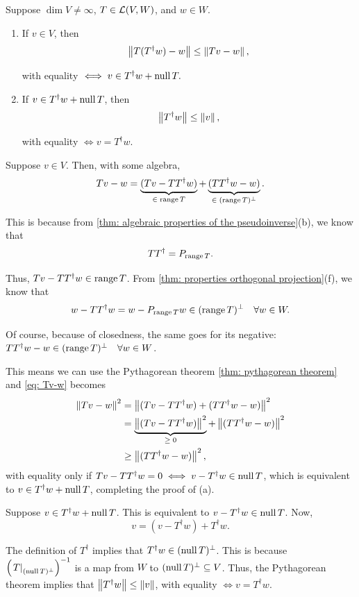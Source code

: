 \begin{thm}
  Suppose $\dim V \neq \infty$, $T \in \mathcal{L}(V,W)$, and $w\in W$.
  \begin{enumerate}[label=\textbf{(\alph*)}]
    \item If $v \in V$, then
    \[
      \left \lVert T(T^\dagger w)-w \right \rVert \leq \left \lVert Tv -w \right \rVert,
    \]

    with equality $\iff v \in T^\dagger w + \operatorname{null} T.$

    \item If $v \in T^\dagger w + \operatorname{null} T$, then
    \[
      \left \lVert T^\dagger w \right \rVert \leq \left \lVert v \right \rVert,
    \]

    with equality $\iff v=T^\dagger w$.
  \end{enumerate}
\end{thm}
\begin{prf}
  Suppose $v\in V$. Then, with some algebra,
  \begin{equation}
    \label{eq: Tv-w}
    Tv -w = \underbrace{(Tv-TT^\dagger w)}_{\in \; \operatorname{range} T} + \underbrace{(TT^\dagger w -w)}_{\in \; (\operatorname{range} T)^\bot}.
  \end{equation}

  This is because from \ref{thm: algebraic properties of the pseudoinverse}(b), we know that
  \[
    TT^\dagger = P_{\operatorname{range} T}.
  \]

  Thus, $Tv-TT^\dagger w\in \operatorname{range} T$. From \ref{thm: properties orthogonal projection}(f), we know that
  \[
    w-TT^\dagger w = w-P_{\operatorname{range} T} w \in (\operatorname{range} T)^\bot \quad \forall w \in W.
  \]

  Of course, because of closedness, the same goes for its negative: $TT^\dagger w-w \in (\operatorname{range} T)^\bot \quad \forall w \in W$.

  This means we can use the Pythagorean theorem \ref{thm: pythagorean theorem} and \eqref{eq: Tv-w} becomes
  \[
    \begin{aligned}
      \left \lVert Tv-w \right \rVert^2 &= \left \lVert (Tv-TT^\dagger w) + (TT^\dagger w -w) \right \rVert^2 \\
      &= \underbrace{\left \lVert (Tv-TT^\dagger w) \right \rVert^2}_{\geq \; 0} + \left \lVert (TT^\dagger w -w) \right \rVert^2 \\
      &\geq \left \lVert (TT^\dagger w -w) \right \rVert^2,
    \end{aligned}
  \]
  with equality only if $Tv - TT^\dagger w=0 \iff v-T^\dagger w \in \operatorname{null} T$, which is equivalent to $v\in T^\dagger w + \operatorname{null} T$, completing the proof of (a).

   Suppose $v \in T^\dagger w + \operatorname{null} T$. This is equivalent to $v-T^\dagger w \in \operatorname{null} T$. Now,
  \[
    v = (v-T^\dagger w) + T^\dagger w.
  \]

  The definition of $T^\dagger$ implies that $T^\dagger w \in (\operatorname{null} T)^\bot$. This is because $\left( \left. T \right|_{(\operatorname{null} T)^\bot} \right)^{-1}$ is a map from $W$ to $(\operatorname{null} T)^\bot \subseteq V$. Thus, the Pythagorean theorem implies that $\left \lVert  T^\dagger w \right \rVert \leq \left \lVert v \right \rVert$, with equality $\iff v=T^\dagger w$.
\end{prf}